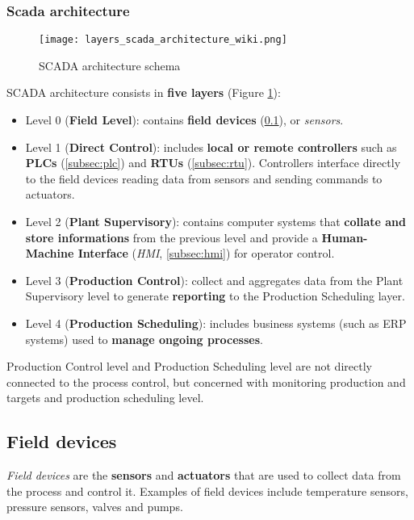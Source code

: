 \subsubsection{Scada architecture}
\begin{figure}[ht]
	\centering
	\texttt{[image: layers\_scada\_architecture\_wiki.png]}
	\caption{SCADA architecture schema}
	\label{fig:SCADA_schema}
\end{figure}

SCADA architecture consists in \textbf{five layers} (Figure \ref{fig:SCADA_schema}):

\begin{itemize}
	\item Level 0 (\textbf{Field Level}): contains \textbf{field devices} (\ref{subsec:field_devs}), or \textit{sensors}.
	\item Level 1 (\textbf{Direct Control}): includes \textbf{local or remote controllers} such as \textbf{PLCs} (\ref{subsec:plc}) and \textbf{RTUs} (\ref{subsec:rtu}). Controllers interface directly to the field devices reading data from sensors and sending commands to actuators.
	\item Level 2 (\textbf{Plant Supervisory}): contains computer systems that \textbf{collate and store informations} from the previous level and provide a \textbf{Human-Machine Interface} (\textit{HMI}, \ref{subsec:hmi}) for operator control.
	\item Level 3 (\textbf{Production Control}): collect and aggregates data from the Plant Supervisory level to generate \textbf{reporting} to the Production Scheduling layer.
	\item Level 4 (\textbf{Production Scheduling}): includes business systems (such as ERP systems) used to \textbf{manage ongoing processes}.
\end{itemize}

Production Control level and Production Scheduling level are not directly connected to the process control, but concerned with monitoring production and targets and production scheduling level.

\subsection{Field devices}
\label{subsec:field_devs}
\textit{Field devices} are the \textbf{sensors} and \textbf{actuators} that are used to collect data from the process and control it. Examples of field devices include temperature sensors, pressure sensors, valves and pumps.
%

